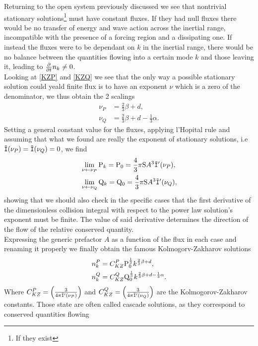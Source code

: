 Returning to the open system previously discussed we see that nontrivial stationary solutions\footnote{If they exist} must have constant fluxes. If they had null fluxes
there would be no transfer of energy and wave action across the inertial range, incompatible with the presence of a forcing region and a dissipating one. If instead the fluxes
were to be dependant on $k$ in the inertial range, there would be no balance between the quantities flowing into a certain mode $k$ and those leaving it, leading to 
$\frac{\partial}{\partial t} n_k \neq 0$. \\
Looking at \eqref{KZP} and \eqref{KZQ} we see that the only way a possible stationary solution could yeald finite flux is to have an exponent $\nu$ which is a zero of 
the denominator, we thus obtain the 2 scalings
\begin{align}
    \nu_P &= \frac{2}{3}\beta + d, \\
    \nu_Q &= \frac{2}{3}\beta + d - \frac{1}{3}\alpha.
\end{align}
Setting a general constant value for the fluxes, applying l'Hopital rule and assuming that what we found are really the exponent of stationary solutions, i.e 
$\tilde{\mathtt{I}}(\nu_P)=\tilde{\mathtt{I}}(\nu_Q)=0$, we find 
\begin{align}
& \lim_{\nu \leftarrow \nu_P}  \mathrm{P}_k = \mathrm{P}_0 = \frac{4}{3}\pi \mathrm{S} A^3 \tilde{\mathtt{I}}'(\nu_P), \label{limP}    \\
& \lim_{\nu \leftarrow \nu_Q}  \mathrm{Q}_k = \mathrm{Q}_0 = \frac{4}{3}\pi \mathrm{S} A^3 \tilde{\mathtt{I}}'(\nu_Q), \label{limQ}
\end{align}
showing that we should also check in the specific cases that the first derivative of the dimensionless collision integral with respect to the power law solution's 
exponent must be finite. The value of said derivative determines the direction of the flow of the relative conserved quantity. \\
Expressing the generic prefactor $A$ as a function of the flux in each case and renaming it properly we finally obtain the famous Kolmogorv-Zakharov solutions 
\begin{align}
    &n_k^P = C_{KZ}^P \mathrm{P}_0^{\frac{1}{3}} k^{\frac{2}{3}\beta + d}, \label{KZPsol}\\
    &n_k^Q = C_{KZ}^Q \mathrm{Q}_0^{\frac{1}{3}} k^{\frac{2}{3}\beta + d - \frac{1}{3}\alpha}. \label{KZQsol}
\end{align}
Where $C_{KZ}^P = \left(\frac{3}{4\pi\tilde{\mathtt{I}}'(\nu_P)}\right)$ and 
$C_{KZ}^Q = \left(\frac{3}{4\pi\tilde{\mathtt{I}}'(\nu_Q)}\right)$ are the Kolmogorov-Zakharov constants. Those state are often called cascade solutions, as they correspond to conserved quantities flowing
